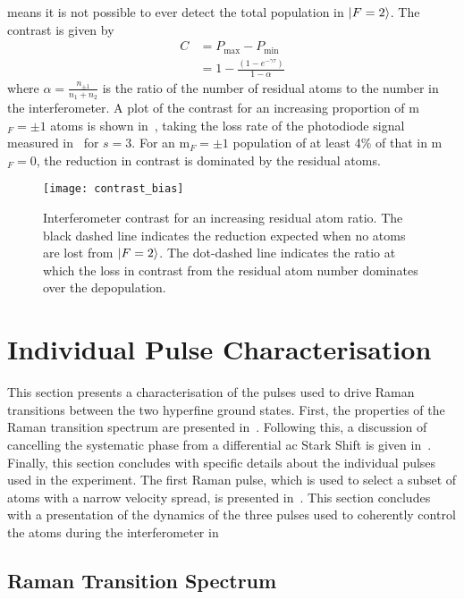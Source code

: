 means it is not possible to ever detect the total
population in \(\ket{F=2}\). The contrast is given by
\begin{align}
  C &=  P_\text{max} - P_\text{min} \nonumber \\
  & = 1 - \frac{(1-e^{-\gamma \tau})}{1-\alpha}
  \label{eq:contrast}
\end{align}
where \(\alpha = \frac{n_{\pm{1}}}{n_1+n_2}\) is the ratio of the
number of residual
atoms to the number in the interferometer.
A plot of the contrast for an increasing
proportion of m\(_F = \pm 1\) atoms is shown
in~, taking the loss rate of the
photodiode signal
measured in~ for \(s = 3\). For an
m\(_F=\pm 1\) population of at least
4\% of that in m\(_F = 0\), the reduction in contrast is dominated by
the residual atoms.  
\begin{figure}[htpb]
  \centering
  \texttt{[image: contrast\_bias]}
  \caption[Interferometer contrast for an increasing
  residual atoms ratio]{Interferometer contrast for an increasing
    residual atom ratio.
    The black dashed line indicates the reduction expected when no
    atoms are lost from \(\ket{F=2}\). The dot-dashed line indicates
  the ratio at which the loss in contrast from the residual atom
number dominates over the depopulation.}
  \label{fig:contrast_bias}
\end{figure}


\section{Individual Pulse Characterisation} \label{sec:atomint_rabiosc}
This section presents a characterisation of the pulses used to drive
Raman transitions between the two hyperfine ground states. First, the
properties of the Raman transition spectrum are presented
in~. Following this, a discussion of
cancelling the systematic phase from a differential ac Stark Shift is
given in~. Finally, this section
concludes with specific details about the individual pulses used in
the experiment. The first Raman pulse, which is used to select a
subset of atoms with a narrow velocity spread, is presented
in~. This section concludes with a presentation
of the dynamics of the three pulses used to coherently control the
atoms during the interferometer in~
\subsection{Raman Transition Spectrum}\label{subsec:raman_spec}

